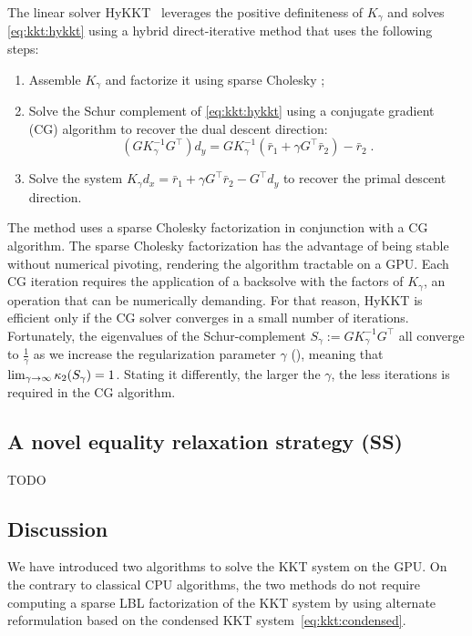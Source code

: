 The linear solver HyKKT~\cite{regev2023hykkt}
leverages the positive definiteness of $K_\gamma$ and solves
\eqref{eq:kkt:hykkt} using a hybrid direct-iterative method
that uses the following steps:
\begin{enumerate}
  \item Assemble $K_\gamma$ and factorize it using sparse Cholesky ;
  \item Solve the Schur complement of \eqref{eq:kkt:hykkt} using a conjugate gradient (CG)
    algorithm to recover the dual descent direction:
    \begin{equation}
      \label{eq:kkt:schurcomplhykkt}
      (G K_\gamma^{-1} G^\top) d_y = G K_\gamma^{-1} (\bar{r}_1 + \gamma G^\top \bar{r}_2) - \bar{r}_2 \; .
    \end{equation}
  \item Solve the system $K_\gamma d_x = \bar{r}_1 + \gamma G^\top \bar{r}_2 - G^\top d_y$
    to recover the primal descent direction.
\end{enumerate}
The method uses a sparse Cholesky factorization in conjunction with a CG algorithm.
The sparse Cholesky factorization has the advantage of being stable without
numerical pivoting, rendering the algorithm tractable on a GPU.
Each CG iteration requires the application of a backsolve with the
factors of $K_\gamma$, an operation that can be numerically demanding. For that reason,
HyKKT is efficient only if the CG solver converges in a small number of iterations.
Fortunately, the eigenvalues of the Schur-complement $S_\gamma := G K_\gamma^{-1} G^\top$
all converge to $\frac{1}{\gamma}$ as we increase the regularization parameter
$\gamma$ (\cite[Theorem 4]{regev2023hykkt}), meaning that $\lim_{\gamma \to \infty} \kappa_2(S_\gamma) = 1$.
Stating it differently,
the larger the $\gamma$, the less iterations is required in the CG algorithm.


\subsection{A novel equality relaxation strategy (SS)}
\label{sec:kkt:sckkt}

TODO

\subsection{Discussion}
We have introduced two algorithms to solve
the KKT system on the GPU. On the contrary to classical CPU algorithms,
the two methods do not require computing a sparse LBL factorization of the KKT
system by using alternate reformulation based on the condensed KKT
system~\eqref{eq:kkt:condensed}.


